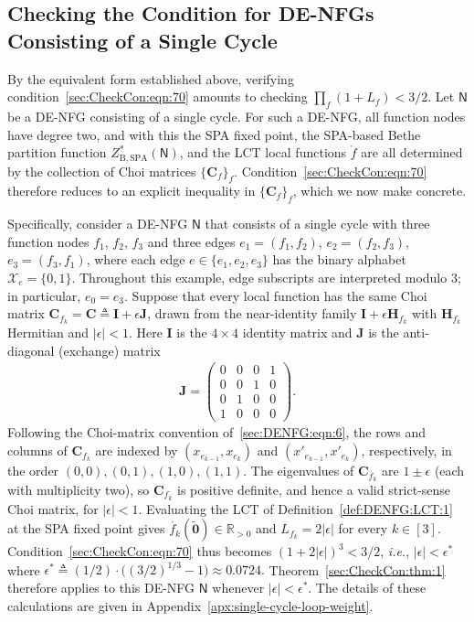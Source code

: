 \documentclass[journal]{IEEEtran}
\newcommand{\add}[1]{{\color{black}#1}}
\newcommand{\vect}[1]{ \bm{#1} }
\newcommand{\set}[1]{\mathcal{#1}}
\newcommand{\sfN}{ \mathsf{N} }
\newcommand{\sR}{\mathbb{R}}
\newcommand{\graphN}{ \mathsf{N} }
\newcommand{\defeq}{ \triangleq }
\newcommand{\ZBSPA}{ Z_{\mathrm{B,SPA}} }
\newcommand{\matr}[1]{\vect{#1}}
\newcommand{\LCT}[1]{ \mathring{#1} }
\newcommand*{\ie}{\textit{i.e.}}
\newcommand{\tv}[1]{ \tilde{\vect{#1}} }
\begin{document}
\add{\subsection{Checking the Condition for DE-NFGs Consisting of a Single
    Cycle}
  \label{sec:extra_example_thm}

  By the equivalent form established above, verifying
  condition~\eqref{sec:CheckCon:eqn:70} amounts to checking
  $\prod_{f}(1+L_f) < 3/2$. Let $\graphN$ be a DE-NFG consisting of a
  single cycle. For such a DE-NFG, all function nodes have degree two, and
  with this the SPA fixed point, the SPA-based Bethe partition function
  $\ZBSPA^{*}(\graphN)$, and the LCT local functions $\LCT{f}$ are all
  determined by the collection of Choi matrices $\{ \matr{C}_f
    \}_{f}$. Condition~\eqref{sec:CheckCon:eqn:70} therefore reduces to an
  explicit inequality in $\{ \matr{C}_f \}_{f}$, which we now make concrete.

  Specifically, consider a DE-NFG $\graphN$ that consists of a single cycle
  with three function nodes $f_1$, $f_2$, $f_3$ and three edges
  $e_1 =(f_1,f_2)$, $e_2 = (f_2,f_3)$, $e_3 = (f_3,f_1)$, where each edge
  $e \in \{e_1,e_2,e_3\}$ has the binary alphabet $\set{X}_e = \{ 0, 1
    \}$. Throughout this example, edge subscripts are interpreted modulo $3$; in
  particular, $e_0=e_3$. Suppose that every local function has the same Choi
  matrix $\matr{C}_{f_k}=\matr{C}\defeq\matr{I}+\epsilon\matr{J}$, drawn from
  the near-identity family $\matr{I}+\epsilon\matr{H}_{f_k}$ with
  $\matr{H}_{f_k}$ Hermitian and $|\epsilon|< 1$. Here $\matr{I}$ is the
  $4 \times 4$ identity matrix and $\matr{J}$ is the anti-diagonal (exchange)
  matrix
  \begin{align*}
    \matr{J} =
    \begin{pmatrix}
      0 & 0 & 0 & 1 \\
      0 & 0 & 1 & 0 \\
      0 & 1 & 0 & 0 \\
      1 & 0 & 0 & 0
    \end{pmatrix}.
  \end{align*}
  \add{Following the Choi-matrix convention of~\eqref{sec:DENFG:eqn:6}, the
    rows and columns of $\matr{C}_{f_k}$ are indexed by
    $(x_{e_{k-1}},x_{e_k})$ and $(x'_{e_{k-1}},x'_{e_k})$, respectively, in
    the order $(0,0),(0,1),(1,0),(1,1)$. The eigenvalues of $\matr{C}_{f_k}$
    are $1\pm\epsilon$ (each with multiplicity two), so $\matr{C}_{f_k}$ is
    positive definite, and hence a valid strict-sense Choi matrix, for
    $|\epsilon|<1$. Evaluating the LCT of Definition~\ref{def:DENFG:LCT:1} at
    the SPA fixed point gives $\LCT{f_k}(\tv{0})\in\sR_{>0}$ and
    $L_{f_k}=2|\epsilon|$ for every $k\in[3]$.}
  Condition~\eqref{sec:CheckCon:eqn:70} thus becomes
  $(1 + 2|\epsilon|)^{3} < 3/2$, \ie, $ |\epsilon| < \epsilon^{*} $ where
  $\epsilon^{*}\defeq (1/2)\cdot \bigl( (3/2)^{1/3} - 1 \bigr) \approx
    0.0724.$ Theorem~\ref{sec:CheckCon:thm:1} therefore applies to this DE-NFG
  $\sfN$ whenever $|\epsilon| < \epsilon^{*}$. The details of these
  calculations are given in Appendix~\ref{apx:single-cycle-loop-weight}.}
\end{document}
